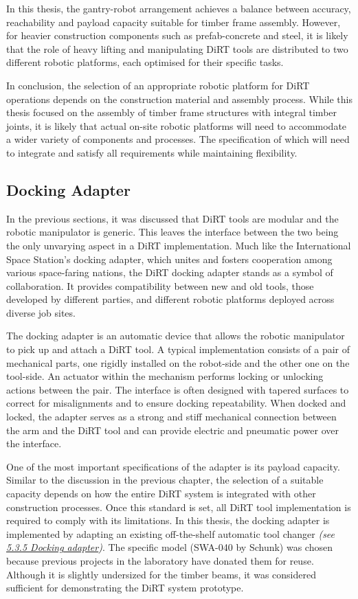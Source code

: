 In this thesis, the gantry-robot arrangement achieves a balance between accuracy, reachability and payload capacity suitable for timber frame assembly. However, for heavier construction components such as prefab-concrete and steel, it is likely that the role of heavy lifting and manipulating DiRT tools are distributed to two different robotic platforms, each optimised for their specific tasks.

In conclusion, the selection of an appropriate robotic platform for DiRT operations depends on the construction material and assembly process. While this thesis focused on the assembly of timber frame structures with integral timber joints, it is likely that actual on-site robotic platforms will need to accommodate a wider variety of components and processes. The specification of which will need to integrate and satisfy all requirements while maintaining flexibility.

\subsection{Docking Adapter}
\label{subsection:discussion-docking-adapter}

In the previous sections, it was discussed that DiRT tools are modular and the robotic manipulator is generic. This leaves the interface between the two being the only unvarying aspect in a DiRT implementation. Much like the International Space Station's docking adapter, which unites and fosters cooperation among various space-faring nations, the DiRT docking adapter stands as a symbol of collaboration. It provides compatibility between new and old tools, those developed by different parties, and different robotic platforms deployed across diverse job sites.

The docking adapter is an automatic device that allows the robotic manipulator to pick up and attach a DiRT tool. A typical implementation consists of a pair of mechanical parts, one rigidly installed on the robot-side and the other one on the tool-side. An actuator within the mechanism performs locking or unlocking actions between the pair. The interface is often designed with tapered surfaces to correct for misalignments and to ensure docking repeatability. When docked and locked, the adapter serves as a strong and stiff mechanical connection between the arm and the DiRT tool and can provide electric and pneumatic power over the interface.

One of the most important specifications of the adapter is its payload capacity. Similar to the discussion in the previous chapter, the selection of a suitable capacity depends on how the entire DiRT system is integrated with other construction processes. Once this standard is set, all DiRT tool implementation is required to comply with its limitations. In this thesis, the docking adapter is implemented by adapting an existing off-the-shelf automatic tool changer \textit{(see \ul{5.3.5 Docking adapter})}. The specific model (SWA-040 by Schunk) was chosen because previous projects in the laboratory have donated them for reuse. Although it is slightly undersized for the timber beams, it was considered sufficient for demonstrating the DiRT system prototype. 

